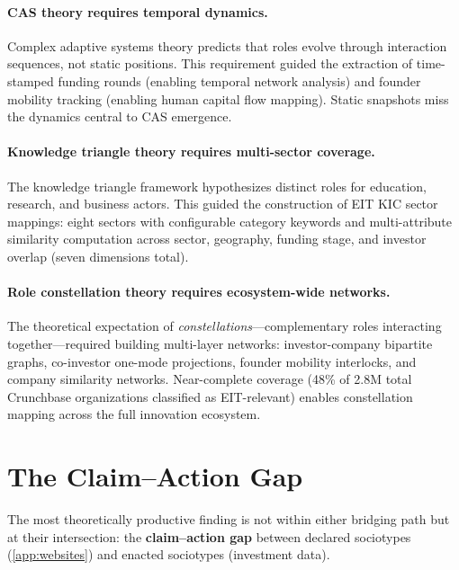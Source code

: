 \documentclass[../main.tex]{subfiles}
\begin{document}
\paragraph{CAS theory requires temporal dynamics.}
Complex adaptive systems theory predicts that roles evolve through
interaction sequences, not static positions.
This requirement guided the extraction of time-stamped funding rounds
(enabling temporal network analysis) and founder mobility tracking
(enabling human capital flow mapping).
Static snapshots miss the dynamics central to CAS emergence.

\paragraph{Knowledge triangle theory requires multi-sector coverage.}
The knowledge triangle framework hypothesizes distinct roles for
education, research, and business actors.
This guided the construction of EIT KIC sector mappings:
eight sectors with configurable category keywords and multi-attribute
similarity computation across sector, geography, funding stage,
and investor overlap (seven dimensions total).

\paragraph{Role constellation theory requires ecosystem-wide networks.}
The theoretical expectation of \emph{constellations}---complementary roles
interacting together---required building multi-layer networks:
investor-company bipartite graphs,
co-investor one-mode projections,
founder mobility interlocks,
and company similarity networks.
Near-complete coverage (48\% of 2.8M total Crunchbase organizations
classified as EIT-relevant) enables constellation mapping across
the full innovation ecosystem.


\section{The Claim--Action Gap}
\label{sec:crunchbase-gap}

The most theoretically productive finding is not within either bridging path
but at their intersection: the \textbf{claim--action gap} between
declared sociotypes (\cref{app:websites}) and enacted sociotypes
(investment data).
\end{document}
